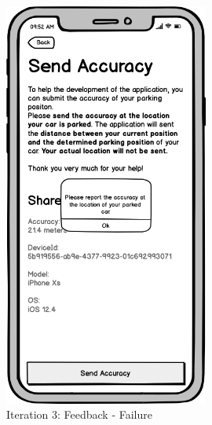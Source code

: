 \begin{figure}[H]
\begin{minipage}[b]{0.45\textwidth}
    \includegraphics[width=0.6\textwidth]{images/UI/Iteration3-Feedback-Failure.png}
    \caption{Iteration 3: Feedback - Failure}
    \label{fig:i3-feedback-fail}
  \end{minipage}
\end{figure}


